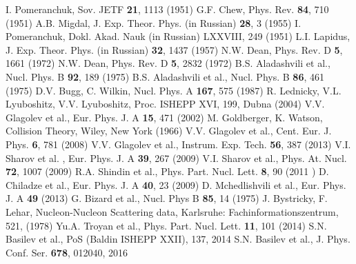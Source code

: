 \documentclass[twocolumn,epjc3]{svjour3}
\providecommand{\DIFaddtex}[1]{{\protect\color{Green} \sf #1}} %
\providecommand{\DIFaddbegin}{} %
\providecommand{\DIFaddend}{} %
\providecommand{\DIFadd}[1]{\texorpdfstring{\DIFaddtex{#1}}{#1}} %
\newcommand{\DIFaddincludegraphics}[2][]{{\color{blue}\fbox{\DIFOincludegraphics[#1]{#2}}}} %
\DeclareRobustCommand{\DIFaddbegin}{\DIFOaddbegin \let\includegraphics\DIFaddincludegraphics} %
\DeclareRobustCommand{\DIFaddend}{\DIFOaddend \let\includegraphics\DIFOincludegraphics} %
\begin{document}
\begin{thebibliography}{99}
  I. Pomeranchuk, Sov. JETF \textbf{21}, 1113 (1951)
  G.F. Chew, Phys. Rev. \textbf{84}, 710 (1951)
  A.B. Migdal, J. Exp. Theor. Phys. (in Russian) \textbf{28}, 3 (1955)
  I. Pomeranchuk, Dokl. Akad. Nauk (in Russian) LXXVIII, 249 (1951)
  L.I. Lapidus, J. Exp. Theor. Phys. (in Russian) \textbf{32}, 1437 (1957)
  N.W. Dean, Phys. Rev. D \textbf{5}, 1661 (1972)
  N.W. Dean, Phys. Rev. D \textbf{5}, 2832 (1972)
  B.S. Aladashvili et al., Nucl. Phys. B \textbf{92}, 189 (1975)
  B.S. Aladashvili et al., Nucl. Phys. B \textbf{86}, 461 (1975)
  D.V. Bugg, C. Wilkin, Nucl. Phys. A \textbf{167}, 575 (1987)
  R. Lednicky, V.L. Lyuboshitz, V.V. Lyuboshitz, Proc. ISHEPP XVI, 199,
  Dubna (2004)
  V.V. Glagolev et al., Eur. Phys. J. A \textbf{15}, 471 (2002)
  M. Goldberger, K. Watson, Collision Theory, Wiley, New York (1966)
  V.V. Glagolev et al., Cent. Eur. J. Phys. \textbf{6}, 781 (2008)
  V.V. Glagolev et al., Instrum. Exp. Tech. \textbf{56}, 387 (2013)
  V.I. Sharov et al.\DIFaddbegin \DIFadd{, }\DIFaddend Eur. Phys. J. A \textbf{39}, 267 (2009)
  V.I. Sharov et al., Phys. At. Nucl. \textbf{72}, 1007 (2009)
  R.A. Shindin et al., Phys. Part. Nucl. Lett. \textbf{8}, 90 (2011\DIFaddbegin \DIFadd{)
}
  \DIFadd{D. Chiladze et al., Eur. Phys. J. A \textbf{40}, 23 (2009)
}
  \DIFadd{D. Mchedlishvili et al., Eur. Phys. J. A \textbf{49} (2013}\DIFaddend )
  G. Bizard et al., Nucl. Phys B \textbf{85}, 14 (1975)
  J. Bystricky, F. Lehar, Nucleon-Nucleon Scattering data, Karlsruhe:
  Fachinformationszentrum, 521, (1978)
  Yu.A. Troyan et al., Phys. Part. Nucl. Lett. \textbf{11}, 101 (2014)
  S.N. Basilev et al., PoS (Baldin ISHEPP XXII), 137, 2014
  S.N. Basilev et al., J. Phys. Conf. Ser. \textbf{678}, 012040, 2016
\end{thebibliography}
\end{document}
